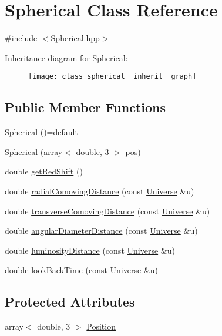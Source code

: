 \hypertarget{class_spherical}{\section{Spherical Class Reference}
\label{class_spherical}
}


{\ttfamily \#include $<$Spherical.\-hpp$>$}



Inheritance diagram for Spherical\-:\nopagebreak
\begin{figure}[H]
\begin{center}
\leavevmode
\texttt{[image: class\_spherical\_\_inherit\_\_graph]}
\end{center}
\end{figure}
\subsection*{Public Member Functions}
\begin{DoxyCompactItemize}
\item 
\hyperlink{class_spherical_ae043654d8006024f2c53aaa6ba35d05d}{Spherical} ()=default
\item 
\hyperlink{class_spherical_aed44cb28b5f4aaf1b98bfb949dddc495}{Spherical} (array$<$ double, 3 $>$ pos)
\item 
double \hyperlink{class_spherical_a6d4d86228d3fc54008206e75a2fa5f13}{get\-Red\-Shift} ()
\item 
double \hyperlink{class_spherical_acab04a7df5d746f275de748c3bae78ed}{radial\-Comoving\-Distance} (const \hyperlink{class_universe}{Universe} \&u)
\item 
double \hyperlink{class_spherical_a973fd2f86c54c2ca0c6adbdc3b869b41}{transverse\-Comoving\-Distance} (const \hyperlink{class_universe}{Universe} \&u)
\item 
double \hyperlink{class_spherical_aec39dd15b36585358eed8168d37b6455}{angular\-Diameter\-Distance} (const \hyperlink{class_universe}{Universe} \&u)
\item 
double \hyperlink{class_spherical_a66d8954554041cc005c3fc437bd5293e}{luminosity\-Distance} (const \hyperlink{class_universe}{Universe} \&u)
\item 
double \hyperlink{class_spherical_a2015656786c8277a9c419f9fa7526246}{look\-Back\-Time} (const \hyperlink{class_universe}{Universe} \&u)
\end{DoxyCompactItemize}
\subsection*{Protected Attributes}
\begin{DoxyCompactItemize}
\item 
array$<$ double, 3 $>$ \hyperlink{class_spherical_a5392e2db54d96ef3d687e007d06982fa}{Position}
\end{DoxyCompactItemize}
